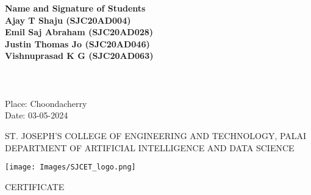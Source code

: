 {{\bf Name and Signature of Students}\vspace{0.5 cm}\\
{ \bf Ajay T Shaju (SJC20AD004)}\\
{ \bf Emil Saj Abraham (SJC20AD028)}\\
{ \bf Justin Thomas Jo (SJC20AD046)}\\
{ \bf Vishnuprasad K G (SJC20AD063)}\\[-0.6mm] \\\\\\
Place: Choondacherry\\ 
Date: 03-05-2024
 

\newpage
\thispagestyle{empty}
\begin{center}
\normalsize{ST. JOSEPH’S COLLEGE OF ENGINEERING AND TECHNOLOGY, PALAI}\\[0.5cm]
\normalsize
 { DEPARTMENT OF ARTIFICIAL INTELLIGENCE AND DATA SCIENCE}\\[1.0cm]%
   \begin{center}
   \texttt{[image: Images/SJCET\_logo.png]}
   \end{center}
{\large CERTIFICATE}\\[1cm]
\end{center}
\normalsize 

}
